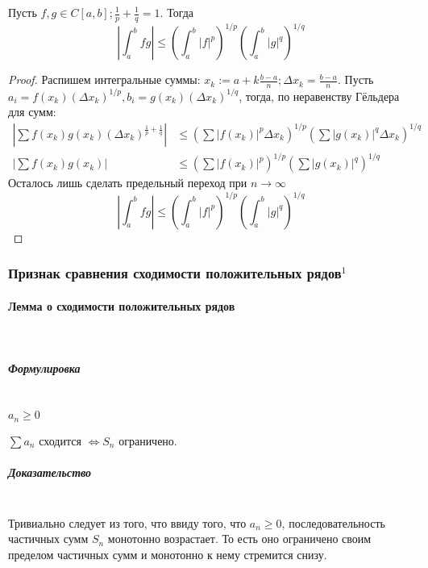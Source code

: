 \documentclass{article}
\let\vanillaparagraph\paragraph
\let\vanillasubparagraph\subparagraph
\renewcommand{\paragraph}[1]{\vanillaparagraph{#1}\mbox{}\\}
\renewcommand{\subparagraph}[1]{\vanillasubparagraph{#1}\mbox{}\\}
\begin{document}
Пусть $f, g \in C[a, b]; \frac{1} {p} + \frac{1} {q} = 1$. Тогда
\begin{equation*}
\left|\int_a^b fg\right| \leq \left(\int_a^b |f|^p\right)^{1/p} \left(\int_a^b |g|^q\right)^{1/q}
\end{equation*}
\begin{proof}
Распишем интегральные суммы: $x_k := a + k\frac{b - a} {n}; \Delta x_k = \frac{b - a} {n}$. Пусть $a_i = f(x_k) (\Delta x_k)^{1/p}, b_i = g(x_k) (\Delta x_k)^{1/q}$, тогда, по неравенству Гёльдера для сумм:
\begin{align*}
\left|\sum f(x_k) g(x_k) (\Delta x_k)^{\frac{1} {p} + \frac{1} {q}} \right| &\leq \left(\sum|f(x_k)|^p \Delta x_k\right)^{1/p} \left(\sum|g(x_k)|^q \Delta x_k\right)^{1/q}\\
\left|\sum f(x_k) g(x_k)  \right| &\leq \left(\sum|f(x_k)|^p \right)^{1/p} \left(\sum|g(x_k)|^q \right)^{1/q}
\end{align*} 
Осталось лишь сделать предельный переход при $n \to \infty$
\begin{equation*}
\left|\int_a^b fg\right| \leq \left(\int_a^b |f|^p\right)^{1/p} \left(\int_a^b |g|^q\right)^{1/q}
\end{equation*}
\end{proof}

\subsubsection{Признак сравнения сходимости положительных рядов\texorpdfstring{$^1$}{}}
\paragraph{Лемма о сходимости положительных рядов}
\subparagraph{Формулировка}
$a_n \ge 0$

$\sum a_n$ сходится $\Leftrightarrow S_n$ ограничено.
\subparagraph{Доказательство}
Тривиально следует из того, что ввиду того, что $a_n \ge 0$, последовательность частичных сумм $S_n$ монотонно возрастает. То есть оно ограничено своим пределом частичных сумм и монотонно к нему стремится снизу.
\end{document}
